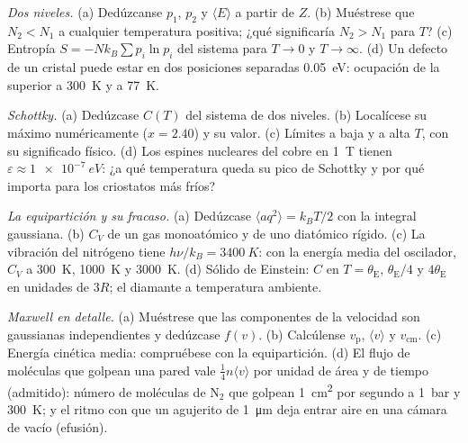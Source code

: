 \begin{exercise}[$\star\star$]\label{exo:b2:boltzmann-factor:5}
\emph{Dos niveles.} (a) Dedúzcanse $p_1$, $p_2$ y $\langle E\rangle$ a partir de $Z$. (b)
Muéstrese que $N_2 < N_1$ a cualquier temperatura positiva; ¿qué significaría $N_2 >
N_1$ para $T$? (c) Entropía $S = -Nk_B\sum p_i\ln p_i$ del sistema para
$T \to 0$ y $T \to \infty$. (d) Un defecto de un cristal puede estar en dos
posiciones separadas \qty{0.05}{eV}: ocupación de la superior a
\qty{300}{K} y a \qty{77}{K}.
\end{exercise}

\begin{exercise}[$\star\star$]\label{exo:b2:boltzmann-factor:6}
\emph{Schottky.} (a) Dedúzcase $C(T)$ del sistema de dos niveles. (b) Localícese
su máximo numéricamente ($x = 2.40$) y su valor. (c) Límites a baja
y a alta $T$, con su significado físico. (d) Los espines nucleares del cobre
en \qty{1}{T} tienen $\varepsilon \approx \qty{1e-7}{eV}$: ¿a qué temperatura queda
su pico de Schottky y por qué importa para los criostatos más
fríos?
\end{exercise}

\begin{exercise}[$\star\star$]\label{exo:b2:boltzmann-factor:7}
\emph{La equipartición y su fracaso.} (a) Dedúzcase $\langle aq^2\rangle =
k_BT/2$ con la integral gaussiana. (b) $C_V$ de un gas monoatómico y de uno
diatómico rígido. (c) La vibración del nitrógeno tiene $h\nu/k_B = \qty{3400}{K}$:
con la energía media del oscilador, $C_V$ a \qty{300}{K}, \qty{1000}{K} y
\qty{3000}{K}. (d) Sólido de Einstein: $C$ en $T = \theta_{\text{E}}$, $\theta_{\text{E}}/4$
y $4\theta_{\text{E}}$ en unidades de $3R$; el diamante a temperatura ambiente.
\end{exercise}

\begin{exercise}[$\star\star$]\label{exo:b2:boltzmann-factor:8}
\emph{Maxwell en detalle.} (a) Muéstrese que las componentes de la velocidad son
gaussianas independientes y dedúzcase $f(v)$. (b) Calcúlense $v_{\text{p}}$,
$\langle v\rangle$ y $v_{\text{cm}}$. (c) Energía cinética media: compruébese con la
equipartición. (d) El flujo de moléculas que golpean una pared vale
$\tfrac14n\langle v\rangle$ por unidad de área y de tiempo (admitido): número de
moléculas de N$_2$ que golpean \qty{1}{cm^2} por segundo a \qty{1}{bar} y
\qty{300}{K}; y el ritmo con que un agujerito de \qty{1}{\micro m} deja entrar aire
en una cámara de vacío (efusión).
\end{exercise}

